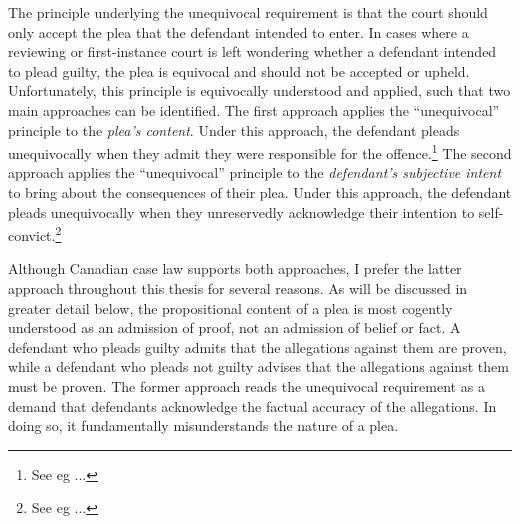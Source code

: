 The principle underlying the unequivocal requirement is that the court should only accept the plea that the defendant intended to enter. In cases where a reviewing or first-instance court is left wondering whether a defendant intended to plead guilty, the plea is equivocal and should not be accepted or upheld. Unfortunately, this principle is equivocally understood and applied, such that two main approaches can be identified. The first approach applies the ``unequivocal'' principle to the \textit{plea's content}. Under this approach, the defendant pleads unequivocally when they admit they were responsible for the offence.\footnote{See eg ...} The second approach applies the ``unequivocal'' principle to the \textit{defendant's subjective intent} to bring about the consequences of their plea. Under this approach, the defendant pleads unequivocally when they unreservedly acknowledge their intention to self-convict.\footnote{See eg ...} 

Although Canadian case law supports both approaches, I prefer the latter approach throughout this thesis for several reasons. As will be discussed in greater detail below, the propositional content of a plea is most cogently understood as an admission of proof, not an admission of belief or fact. A defendant who pleads guilty admits that the allegations against them are proven, while a defendant who pleads not guilty advises that the allegations against them must be proven. The former approach reads the unequivocal requirement as a demand that defendants acknowledge the factual accuracy of the allegations. In doing so, it fundamentally misunderstands the nature of a plea.